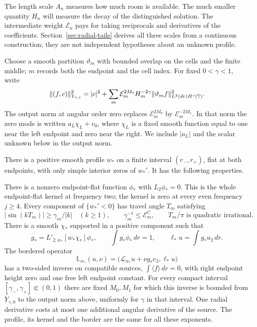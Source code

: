 The length scale $A_n$ measures how much room is available.  The much
smaller quantity $H_n$ will measure the decay of the distinguished
solution.  The intermediate weight $\mathcal E_n$ pays for taking
reciprocals and derivatives of the coefficients.  Section~\ref{sec:radial-tails}
derives all three scales from a continuous construction; they are not
independent hypotheses about an unknown profile.

Choose a smooth partition $\vartheta_m$ with bounded overlap on the
cells and the finite middle; $m$ records both the endpoint and the cell
index.  For fixed $0<\gamma<1$, write
\begin{equation}\label{eq:rad-eq-source-norm}
 \|(f,c)\|_{Y_{\gamma,s}}^2
 =|c|^2+\sum_m\mathcal E_m^{2M_0}H_m^{-2\gamma}
       \|\vartheta_m f\|_{L^2(dr)H^s(\mathbb T)}^2.
\end{equation}
The output norm at angular order zero replaces
$\mathcal E_m^{2M_0}$ by $\mathcal E_m^{-2M_1}$.
In that norm the zero mode is written $a_L\chi_L+v_0$, where
$\chi_L$ is a fixed smooth function equal to one near the left endpoint
and zero near the right.  We include $|a_L|$ and the scalar unknown
below in the output norm.

\begin{proposition}\label{prop:rad-fixed-theorem}
There is a positive smooth profile $w_*$ on a finite interval
$(r_-,r_+)$, flat at both endpoints, with only simple interior zeros of
$w_*'$.  It has the following properties.

There is a nonzero endpoint-flat function $\phi_*$ with
$L_2\phi_*=0$.  This is the whole endpoint-flat kernel at frequency two;
the kernel is zero at every even frequency $j\ge4$.  Every component
of $\{w_*'<0\}$ has travel angle $T_m$ satisfying
\begin{equation}\label{eq:rad-eq-optical-margin}
 |\sin(kT_m)|\ge\gamma_m/|k|\quad(k\ge1),
 \qquad \gamma_m^{-1}\le\mathcal E_m^{C},
 \qquad T_m/\pi\text{ is quadratic irrational}.
\end{equation}
There is a smooth $\chi_*$ supported in a positive component such that
\begin{equation}\label{eq:rad-eq-target-border}
 g_*=L'_{2,w_*}[w_*\chi_*]\phi_*,\qquad
 \int g_*\phi_*\,dr=1,\qquad
 \ell_*u=\int g_*u_2\,dr.
\end{equation}
The bordered operator
\begin{equation}\label{eq:rad-eq-bordered-reference}
 \mathbb L_{w_*}(u,\nu)
   =\bigl(\mathscr L_{w_*}u+\nu g_*e_2,\ell_*u\bigr)
\end{equation}
has a two-sided inverse on compatible sources,
$\int\langle f\rangle\,dr=0$, with right endpoint height zero and
one free left endpoint constant.  For every compact interval
$[\gamma_-,\gamma_+]\Subset(0,1)$ there are fixed $M_0,M_1$ for which
this inverse is bounded from $Y_{\gamma,0}$ to the output norm above,
uniformly for $\gamma$ in that interval.  One radial derivative costs
at most one additional angular derivative of the source.  The profile,
its kernel and the border are the same for all these exponents.
\end{proposition}

